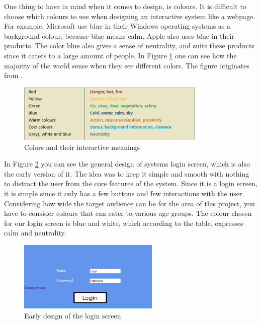 One thing to have in mind when it comes to design, is colours. It is difficult to choose which colours to use when designing an interactive system like a webpage. For example, Microsoft use blue in their Windows operating systems as a background colour, because blue means calm. Apple also uses blue in their products. The color blue also gives a sense of neutrality, and suits these products since it caters to a large amount of people. In Figure \ref{Colors} one can see how the majority of the world sense when they see different colors. The figure originates from \cite{DEBBook}.

\begin{figure}[htb]
\centering
\includegraphics[width=0.8\textwidth]{Images/Colors.png}
\caption{Colors and their interactive meanings}
\label{Colors}
\end{figure}

In Figure \ref{Login} you can see the general design of systems login screen, which is also the early version of it. The idea was to keep it simple and smooth with nothing to distract the user from the core features of the system. Since it is a login screen, it is simple since it only has a few buttons and few interactions with the user. Considering how wide the target audience can be for the area of this project, you have to consider colours that can cater to various age groups. The colour chosen for our login screen is blue and white, which according to the table, expresses calm and neutrality.

\begin{figure}[htb]
\centering
\includegraphics[width=0.6\textwidth]{Images/Login.png}
\caption{Early design of the login screen}
\label{Login}
\end{figure}

